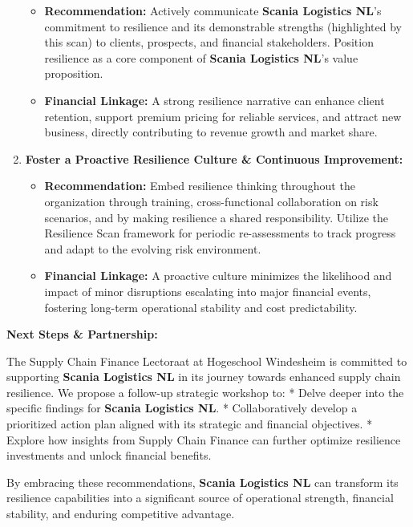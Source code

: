 \documentclass[
  oneside,
  open=any,
  fontsize=11pt]{scrbook}
\providecommand{\tightlist}{%
  \setlength{\itemsep}{0pt}\setlength{\parskip}{0pt}}
\begin{document}
\begin{enumerate}
  \begin{itemize}
  \tightlist
  \item
    \textbf{Recommendation:} Actively communicate \textbf{Scania
    Logistics NL}'s commitment to resilience and its demonstrable
    strengths (highlighted by this scan) to clients, prospects, and
    financial stakeholders. Position resilience as a core component of
    \textbf{Scania Logistics NL}'s value proposition.
  \item
    \textbf{Financial Linkage:} A strong resilience narrative can
    enhance client retention, support premium pricing for reliable
    services, and attract new business, directly contributing to revenue
    growth and market share.
  \end{itemize}
\item
  \textbf{Foster a Proactive Resilience Culture \& Continuous
  Improvement:}

  \begin{itemize}
  \tightlist
  \item
    \textbf{Recommendation:} Embed resilience thinking throughout the
    organization through training, cross-functional collaboration on
    risk scenarios, and by making resilience a shared responsibility.
    Utilize the Resilience Scan framework for periodic re-assessments to
    track progress and adapt to the evolving risk environment.
  \item
    \textbf{Financial Linkage:} A proactive culture minimizes the
    likelihood and impact of minor disruptions escalating into major
    financial events, fostering long-term operational stability and cost
    predictability.
  \end{itemize}
\end{enumerate}

\textbf{Next Steps \& Partnership:}

The Supply Chain Finance Lectoraat at Hogeschool Windesheim is committed
to supporting \textbf{Scania Logistics NL} in its journey towards
enhanced supply chain resilience. We propose a follow-up strategic
workshop to: * Delve deeper into the specific findings for
\textbf{Scania Logistics NL}. * Collaboratively develop a prioritized
action plan aligned with its strategic and financial objectives. *
Explore how insights from Supply Chain Finance can further optimize
resilience investments and unlock financial benefits.

By embracing these recommendations, \textbf{Scania Logistics NL} can
transform its resilience capabilities into a significant source of
operational strength, financial stability, and enduring competitive
advantage.
\end{document}
